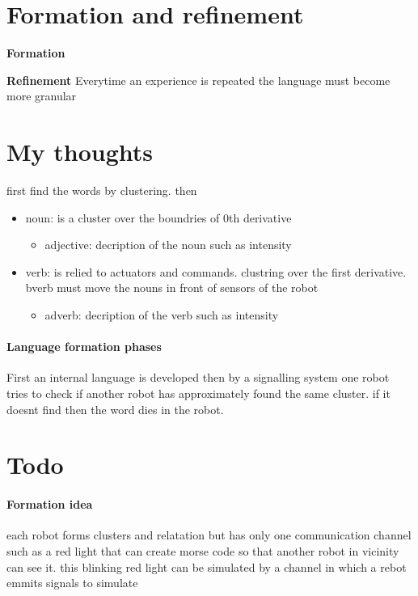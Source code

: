     \section{Formation and refinement}
        \textbf{Formation}

        \textbf{Refinement} Everytime an experience is repeated the language must become more granular







\section{My thoughts}
    first find the words by clustering. then
    \begin{itemize}
        \item noun: is a cluster over the boundries of 0th derivative
            \begin{itemize}
                \item adjective: decription of the noun such as intensity
            \end{itemize}
        \item verb: is relied to actuators and commands. clustring over the first derivative. bverb must move the nouns in front of sensors of the robot
            \begin{itemize}
                \item adverb: decription of the verb such as intensity
            \end{itemize}
    \end{itemize}

    \paragraph{Language formation phases}
    First an internal language is developed then by a signalling system one robot tries to check if another robot has approximately found the same cluster. if it doesnt find then the word dies in the robot.
\section{Todo}
    \paragraph{Formation idea}
        each robot  forms clusters and relatation but has only one communication channel such as a red light that can create morse code so that another robot in vicinity can see it. this blinking red light can be simulated by a channel in which a rebot emmits signals to simulate

